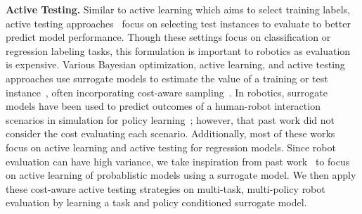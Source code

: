 \textbf{Active Testing.}
Similar to active learning which aims to select training labels, active testing approaches~\cite{sawade2010active, rainforth2024modern, yilmaz2021sample} focus on selecting test instances to evaluate to better predict model performance. 
Though these settings focus on classification or regression labeling tasks, this formulation is important to robotics as evaluation is expensive.
Various Bayesian optimization, active learning, and active testing approaches use surrogate models to estimate the value of a training or test instance~\cite{eggensperger2015efficient, brochu2010tutorial, shahriari2015taking, cozad2014learning,qian2006building, kossen2021active}, often incorporating cost-aware sampling~\cite{lee2020cost, paria2020cost}.
In robotics, surrogate models have been used to predict outcomes of a human-robot interaction scenarios in simulation for policy learning~\cite{bhatt2023surrogate}; however, that past work did not consider the cost evaluating each scenario.
Additionally, most of these works focus on active learning and active testing for regression models.
Since robot evaluation can have high variance, we take inspiration from past work~\cite{tosh2022targeted} to focus on active learning of probablistic models using a surrogate model.
We then apply these cost-aware active testing strategies on multi-task, multi-policy robot evaluation by learning a task and policy conditioned surrogate model.




